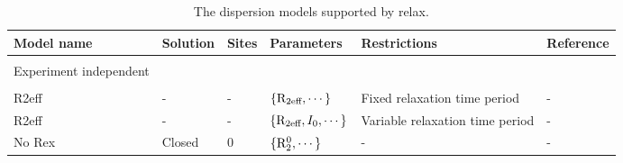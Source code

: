 \begin{landscape}
\begin{center}
\begin{small}

\begin{longtable}{llllll}

\caption[The dispersion models.]{The dispersion models supported by relax.}

\\
\toprule
Model name               & Solution & Sites & Parameters                                          & Restrictions                      & Reference \\
\midrule
\endhead

\bottomrule
\endfoot

\label{table: dispersion models}

\\[-5pt]
Experiment independent \\
\cline{1-1}
\\[-5pt]
R2eff                    & -        & -     & $\{\mathrm{R}_\textrm{2eff}, \cdots\}$                              & Fixed relaxation time period      & - \\
R2eff                    & -        & -     & $\{\mathrm{R}_\textrm{2eff}, I_0, \cdots\}$                         & Variable relaxation time period   & - \\
No Rex                   & Closed   & 0     & $\{\mathrm{R}_2^0, \cdots\}$                             & -                                 & - \\


\end{longtable}
\end{small}
\end{center}
\end{landscape}
